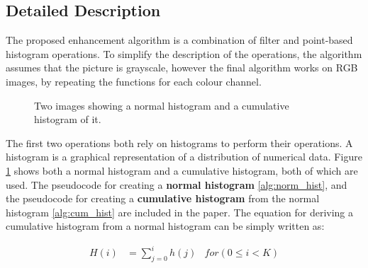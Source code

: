 \documentclass[journal,transmag]{IEEEtran}
\begin{document}
\subsection{Detailed Description}
The proposed enhancement algorithm is a combination of filter and point-based histogram operations. To simplify the description of the operations, the algorithm assumes that the picture is grayscale, however the final algorithm works on RGB images, by repeating the functions for each colour channel. 
\begin{figure}[t] %
	\centering
	\caption{Two images showing a normal histogram and a cumulative histogram of it.}
	\label{fig:hist_comp}
\end{figure}
The first two operations both rely on histograms to perform their operations. A histogram is a graphical representation of a distribution of numerical data\cite{histDesc}\cite{histDescWiki}. Figure \ref{fig:hist_comp} shows both a normal histogram and a cumulative histogram, both of which are used. The pseudocode for creating a \textbf{normal histogram} \ref{alg:norm_hist}, and the pseudocode for creating a \textbf{cumulative histogram} from the normal histogram \ref{alg:cum_hist} are included in the paper. The equation for deriving a cumulative histogram from a normal histogram can be simply written as: 

\begin{equation}%
\begin{aligned}
H(i) &=  \sum_{j = 0}^{i}h(j) 
& for(0 \leq i < K)
\end{aligned}
\end{equation}
\end{document}
